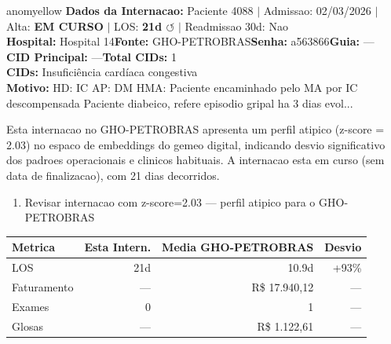 \documentclass[a4paper,10pt]{article}
\begin{document}
\begin{anomalycard}[Internacao 167444 | GHO-PETROBRAS | MODERADO (z=2.03)]{anomyellow}
\textbf{Dados da Internacao:} Paciente 4088 $\mid$ Admissao: 02/03/2026 $\mid$ Alta: \textcolor{anomorange}{\textbf{EM CURSO}} $\mid$ LOS: \textbf{21d \textcolor{anomorange}{$\circlearrowleft$}} $\mid$ Readmissao 30d: Nao\\
\textbf{Hospital:} Hospital 14\quad\textbf{Fonte:} GHO-PETROBRAS\quad\textbf{Senha:} a563866\quad\textbf{Guia:} ---\\
\textbf{CID Principal:} {\small ---}\quad\textbf{Total CIDs:} 1\\

\textbf{CIDs:} {\scriptsize Insuficiência cardíaca congestiva}\\

\textbf{Motivo:} {\scriptsize HD: IC  AP: DM  HMA: Paciente encaminhado pelo MA por IC descompensada Paciente diabeico, refere episodio gripal ha 3 dias evol...}\\

\vspace{2pt}\begin{tcolorbox}[colback=severityred!20,colframe=anomyellow,title={\textbf{Interpretacao de Negocio}},fonttitle=\bfseries\small,left=4pt,right=4pt,top=3pt,bottom=3pt]
{\small Esta internacao no GHO-PETROBRAS apresenta um perfil atipico (z-score = 2.03) no espaco de embeddings do gemeo digital, indicando desvio significativo dos padroes operacionais e clinicos habituais. A internacao esta em curso (sem data de finalizacao), com 21 dias decorridos.}
\end{tcolorbox}
\begin{tcolorbox}[colback=severityyellow!30,colframe=anomorange,title={\textbf{Recomendacoes Especificas}},fonttitle=\bfseries\small,left=4pt,right=4pt,top=3pt,bottom=3pt]
\begin{enumerate}[nosep,leftmargin=16pt]
\item {\small Revisar internacao com z-score=2.03 --- perfil atipico para o GHO-PETROBRAS}
\end{enumerate}
\end{tcolorbox}
\begin{center}\begin{tabular}{l r r r}\toprule\textbf{Metrica} & \textbf{Esta Intern.} & \textbf{Media GHO-PETROBRAS} & \textbf{Desvio} \\\midrule
LOS & 21d & 10.9d & \textcolor{anomorange}{+93\%} \\
Faturamento & --- & R\$ 17.940,12 & --- \\
Exames & 0 & 1 & --- \\
Glosas & --- & R\$ 1.122,61 & --- \\
\bottomrule\end{tabular}\end{center}


\end{anomalycard}
\end{document}
